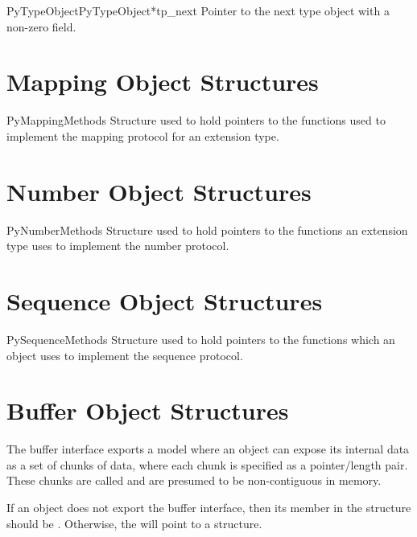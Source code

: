 \begin{cmemberdesc}{PyTypeObject}{PyTypeObject*}{tp_next}
  Pointer to the next type object with a non-zero 
  field.
\end{cmemberdesc}


\section{Mapping Object Structures \label{mapping-structs}}

\begin{ctypedesc}{PyMappingMethods}
  Structure used to hold pointers to the functions used to implement
  the mapping protocol for an extension type.
\end{ctypedesc}


\section{Number Object Structures \label{number-structs}}

\begin{ctypedesc}{PyNumberMethods}
  Structure used to hold pointers to the functions an extension type
  uses to implement the number protocol.
\end{ctypedesc}


\section{Sequence Object Structures \label{sequence-structs}}

\begin{ctypedesc}{PySequenceMethods}
  Structure used to hold pointers to the functions which an object
  uses to implement the sequence protocol.
\end{ctypedesc}


\section{Buffer Object Structures \label{buffer-structs}}

The buffer interface exports a model where an object can expose its
internal data as a set of chunks of data, where each chunk is
specified as a pointer/length pair.  These chunks are called
 and are presumed to be non-contiguous in memory.

If an object does not export the buffer interface, then its
 member in the  structure
should be \NULL.  Otherwise, the  will point to
a  structure.

